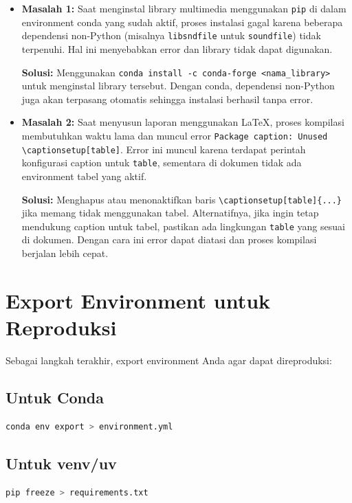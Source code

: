 \documentclass[11pt,a4paper]{article}
\begin{document}
\begin{itemize}
    \item \textbf{Masalah 1:} Saat menginstal library multimedia menggunakan \texttt{pip} di dalam environment conda yang sudah aktif, proses instalasi gagal karena beberapa dependensi non-Python (misalnya \texttt{libsndfile} untuk \texttt{soundfile}) tidak terpenuhi. Hal ini menyebabkan error dan library tidak dapat digunakan.
    
    \textbf{Solusi:} Menggunakan \texttt{conda install -c conda-forge <nama\_library>} untuk menginstal library tersebut. Dengan conda, dependensi non-Python juga akan terpasang otomatis sehingga instalasi berhasil tanpa error.
    
    \item \textbf{Masalah 2:} Saat menyusun laporan menggunakan LaTeX, proses kompilasi membutuhkan waktu lama dan muncul error \texttt{Package caption: Unused \textbackslash captionsetup[table]}. Error ini muncul karena terdapat perintah konfigurasi caption untuk \texttt{table}, sementara di dokumen tidak ada environment tabel yang aktif.
    
    \textbf{Solusi:} Menghapus atau menonaktifkan baris \texttt{\textbackslash captionsetup[table]\{...\}} jika memang tidak menggunakan tabel. Alternatifnya, jika ingin tetap mendukung caption untuk tabel, pastikan ada lingkungan \texttt{table} yang sesuai di dokumen. Dengan cara ini error dapat diatasi dan proses kompilasi berjalan lebih cepat.
\end{itemize}

\section{Export Environment untuk Reproduksi}
Sebagai langkah terakhir, export environment Anda agar dapat direproduksi:

\subsection{Untuk Conda}
\begin{lstlisting}[language=bash, caption=Export conda environment]
conda env export > environment.yml
\end{lstlisting}

\subsection{Untuk venv/uv}
\begin{lstlisting}[language=bash, caption=Export pip requirements]
pip freeze > requirements.txt
\end{lstlisting}
\end{document}
